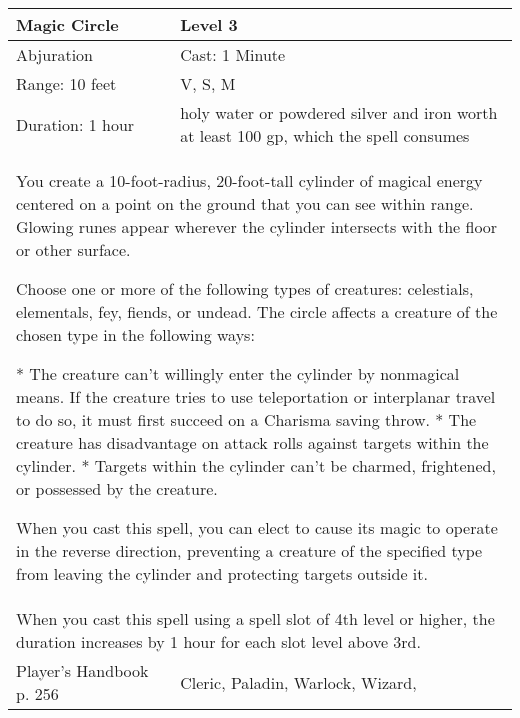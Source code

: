 \documentclass[11pt]{report}
\begin{document}
\begin{table}[H]
	\begin{tabular}{||p{6cm}|p{6cm}||}
		\hline\hline
		\bf{Magic Circle} & Level 3\\ \hline
		Abjuration & Cast: 1 Minute\\ \hline
		Range: 10 feet & V, S, M\\ \hline
		Duration: 1 hour & holy water or powdered silver and iron worth at least 100 gp, which the spell consumes\\ \hline
		\multicolumn{2}{||p{12cm}||}{You create a 10-foot-radius, 20-foot-tall cylinder of magical energy centered on a point on the ground that you can see within range. Glowing runes appear wherever the cylinder intersects with the floor or other surface.

Choose one or more of the following types of creatures: celestials, elementals, fey, fiends, or undead. The circle affects a creature of the chosen type in the following ways:

* The creature can’t willingly enter the cylinder by nonmagical means. If the creature tries to use teleportation or interplanar travel to do so, it must first succeed on a Charisma saving throw.
* The creature has disadvantage on attack rolls against targets within the cylinder.
* Targets within the cylinder can’t be charmed, frightened, or possessed by the creature.

When you cast this spell, you can elect to cause its magic to operate in the reverse direction, preventing a creature of the specified type from leaving the cylinder and protecting targets outside it.}\\ \hline
		\multicolumn{2}{||p{12cm}||}{When you cast this spell using a spell slot of 4th level or higher, the duration increases by 1 hour for each slot level above 3rd.}\\ \hline
Player's Handbook p. 256 & Cleric, Paladin, Warlock, Wizard, \\ \hline\hline
	\end{tabular}
\end{table}
\end{document}
